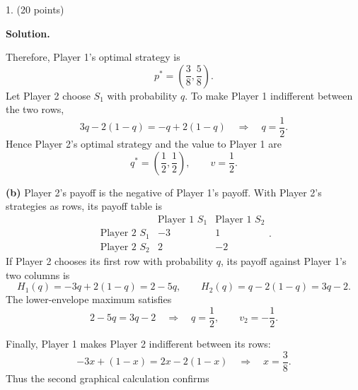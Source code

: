 \documentclass[11pt,letterpaper]{article}
\newenvironment{examquestion}[2]{%
  \clearpage
  \begin{list}{}{%
    \setlength{\leftmargin}{2.15em}%
    \setlength{\labelwidth}{1.55em}%
    \setlength{\labelsep}{0.60em}%
    \setlength{\itemindent}{0pt}%
    \setlength{\listparindent}{0pt}%
    \setlength{\parsep}{0.42em}%
    \setlength{\topsep}{0pt}%
  }
  \item[\hfill #1.] (#2 points)\ 
}{%
  \end{list}
}
\newenvironment{solution}{%
  \par\medskip
  \color{red}
  \noindent\textbf{Solution.}\par
}{%
  \par
  \color{black}
}
\newcommand{\Prob}{\mathbb{P}}
\newcommand{\answerbox}[1]{%
  \par\smallskip\begingroup
  \setlength{\fboxsep}{4pt}%
  \setlength{\fboxrule}{0.7pt}%
  \noindent\makebox[\linewidth][c]{\fbox{$\displaystyle #1$}}%
  \par\endgroup\smallskip
}
\begin{document}
\begin{examquestion}{1}{20}
\begin{solution}
Therefore, Player 1's optimal strategy is
\[
p^*=\left(\frac38,\frac58\right).
\]
Let Player 2 choose $S_1$ with probability $q$. To make Player 1 indifferent
between the two rows,
\[
3q-2(1-q)=-q+2(1-q)
\quad\Longrightarrow\quad
q=\frac12.
\]
Hence Player 2's optimal strategy and the value to Player 1 are
\[
q^*=\left(\frac12,\frac12\right),
\qquad v=\frac12.
\]

\textbf{(b)} Player 2's payoff is the negative of Player 1's payoff. With Player
2's strategies as rows, its payoff table is
\[
\begin{array}{c|cc}
&\text{Player 1 }S_1&\text{Player 1 }S_2\\ \hline
\text{Player 2 }S_1&-3&1\\
\text{Player 2 }S_2&2&-2
\end{array}.
\]
If Player 2 chooses its first row with probability $q$, its payoff against Player
1's two columns is
\[
H_1(q)=-3q+2(1-q)=2-5q,
\qquad
H_2(q)=q-2(1-q)=3q-2.
\]
The lower-envelope maximum satisfies
\[
2-5q=3q-2
\quad\Longrightarrow\quad
q=\frac12,
\qquad
v_2=-\frac12.
\]

\begin{center}
\end{center}

Finally, Player 1 makes Player 2 indifferent between its rows:
\[
-3x+(1-x)=2x-2(1-x)
\quad\Longrightarrow\quad
x=\frac38.
\]
Thus the second graphical calculation confirms
\answerbox{
p^*=\left(\frac38,\frac58\right),
\qquad
q^*=\left(\frac12,\frac12\right),
\qquad
v_1=\frac12,\quad v_2=-\frac12
}
\end{solution}
\end{examquestion}
\end{document}
